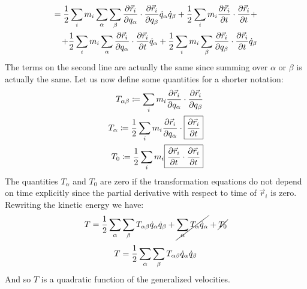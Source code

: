 \begin{equation}
    \begin{split}
        = \dfrac{1}{2}\displaystyle\sum_i m_i \displaystyle\sum_{\alpha}\displaystyle\sum_{\beta}\dfrac{\partial \vec{r}_i}{\partial q_{\alpha}}\cdot\dfrac{\partial \vec{r}_i}{\partial q_{\beta}}\dot{q}_{\alpha}\dot{q}_{\beta} + \dfrac{1}{2}\displaystyle\sum_i m_i \dfrac{\partial \vec{r}_i}{\partial t} \cdot \dfrac{\partial \vec{r}_i}{\partial t} +\\
        + \dfrac{1}{2}\displaystyle\sum_i m_i \displaystyle\sum_{\alpha}\dfrac{\partial \vec{r}_i}{\partial q_{\alpha}} \cdot \dfrac{\partial \vec{r}_i}{\partial t} \dot{q}_{\alpha} + \dfrac{1}{2}\displaystyle\sum_i m_i \displaystyle\sum_{\beta}\dfrac{\partial \vec{r}_i}{\partial q_{\beta}} \cdot \dfrac{\partial \vec{r}_i}{\partial t}\dot{q}_{\beta}
    \end{split}
\end{equation}
The terms on the second line are actually the same since summing over $\alpha$ or $\beta$ is actually the same. Let us now define some quantities for a shorter notation:
\begin{equation}
    \begin{split}
        T_{\alpha \beta} \coloneqq \displaystyle\sum_i m_i \dfrac{\partial \vec{r}_i}{\partial q_{\alpha}}\cdot\dfrac{\partial \vec{r}_i}{\partial q_{\beta}}\\
        T_{\alpha} \coloneqq \dfrac{1}{2} \displaystyle\sum_i m_i \dfrac{\partial \vec{r}_i}{\partial q_{\alpha}} \cdot \boxed{\dfrac{\partial \vec{r}_i}{\partial t}}\\
        T_0 \coloneqq \dfrac{1}{2}\displaystyle\sum_i m_i \boxed{\dfrac{\partial \vec{r}_i}{\partial t} \cdot \dfrac{\partial \vec{r}_i}{\partial t}}
    \end{split}
\end{equation}
The quantities $T_{\alpha}$ and $T_0$ are zero if the transformation equations do not depend on time explicitly since the partial derivative with respect to time of $\vec{r}_i$ is zero. Rewriting the kinetic energy we have:
\begin{equation}
    T = \dfrac{1}{2}\displaystyle\sum_{\alpha}\displaystyle\sum_{\beta}T_{\alpha \beta}\dot{q}_{\alpha}\dot{q}_{\beta} + \cancel{\displaystyle\sum_{\alpha}T_{\alpha}\dot{q}_{\alpha}} + \cancel{T_0}
\end{equation}
\begin{equation} \label{e:kinetic_energy}
    T = \dfrac{1}{2}\displaystyle\sum_{\alpha}\displaystyle\sum_{\beta}T_{\alpha \beta}\dot{q}_{\alpha}\dot{q}_{\beta}
\end{equation}
And so $T$ is a quadratic function of the generalized velocities.\\
